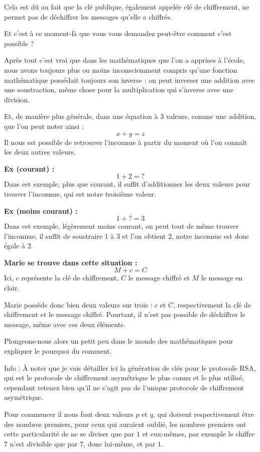 \documentclass[
  paper=a4,
  ,captions=tableheading
]{scrartcl}
\renewenvironment{quote}{\begin{customblockquote}\list{}{\rightmargin=0em\leftmargin=0em}%
\item\relax\color{blockquote-text}\ignorespaces}{\unskip\unskip\endlist\end{customblockquote}}
\begin{document}
Cela est dû au fait que la clé publique, également appelée clé de
chiffrement, ne permet pas de déchiffrer les messages qu'elle a
chiffrés.

Et c'est à ce moment-là que vous vous demandez peut-être comment c'est
possible ?

Après tout c'est vrai que dans les mathématiques que l'on a apprises à
l'école, nous avons toujours plus ou moins inconsciemment compris qu'une
fonction mathématique possédait toujours son inverse : on peut inverser
une addition avec une soustraction, même chose pour la multiplication
qui s'inverse avec une division.

Et, de manière plus générale, dans une équation à 3 valeurs, comme une
addition, que l'on peut noter ainsi : \[
x + y = z
\] Il nous est possible de retrouver l'inconnue à partir du moment où
l'on connaît les deux autres valeurs.

\textbf{Ex (courant) :} \[
1+2=?
\] Dans cet exemple, plus que courant, il suffit d'additionner les deux
valeurs pour trouver l'inconnue, qui est notre troisième valeur.

\textbf{Ex (moins courant) :} \[
1+?=3
\] Dans cet exemple, légèrement moins courant, on peut tout de même
trouver l'inconnue, il suffit de soustraire \(1\) à \(3\) et l'on
obtient \(2\), notre inconnue est donc égale à \(2\).

\textbf{Marie se trouve dans cette situation :} \[
M+c=C
\] Ici, \(c\) représente la clé de chiffrement, \(C\) le message chiffré
et \(M\) le message en clair.

Marie possède donc bien deux valeurs sur trois : \(c\) et \(C\),
respectivement la clé de chiffrement et le message chiffré. Pourtant, il
n'est pas possible de déchiffrer le message, même avec ces deux
éléments.

Plongeons-nous alors un petit peu dans le monde des mathématiques pour
expliquer le pourquoi du comment.

\begin{quote}
Info : À noter que je vais détailler ici la génération de clés pour le
protocole RSA, qui est le protocole de chiffrement asymétrique le plus
connu et le plus utilisé, cependant retenez bien qu'il ne s'agit pas de
l'unique protocole de chiffrement asymétrique.
\end{quote}

Pour commencer il nous faut deux valeurs \(p\) et \(q\), qui doivent
respectivement être des nombres premiers, pour ceux qui auraient oublié,
les nombres premiers ont cette particularité de ne se diviser que par
\(1\) et eux-mêmes, par exemple le chiffre \(7\) n'est divisible que par
\(7\), donc lui-même, et par \(1\).
\end{document}

